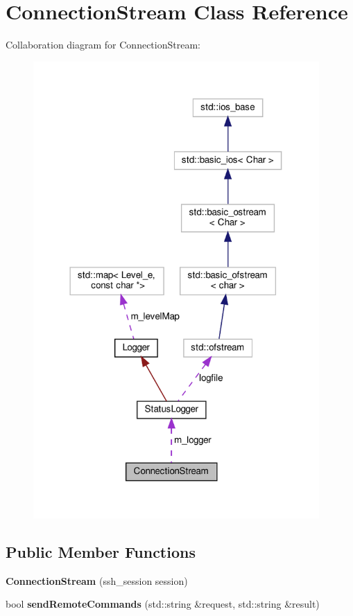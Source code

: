 \hypertarget{classConnectionStream}{}\section{Connection\+Stream Class Reference}
\label{classConnectionStream}


Collaboration diagram for Connection\+Stream\+:\nopagebreak
\begin{figure}[H]
\begin{center}
\leavevmode
\includegraphics[width=309pt]{classConnectionStream__coll__graph}
\end{center}
\end{figure}
\subsection*{Public Member Functions}
\begin{DoxyCompactItemize}
\item 
\mbox{\label{classConnectionStream_a90b1fa3e20b531f40b5dff907ebe6e75}} 
{\bfseries Connection\+Stream} (ssh\+\_\+session session)
\item 
\mbox{\label{classConnectionStream_a3e15cc23cc086eab18ac6ca4a084fe72}} 
bool {\bfseries send\+Remote\+Commands} (std\+::string \&request, std\+::string \&result)
\end{DoxyCompactItemize}
